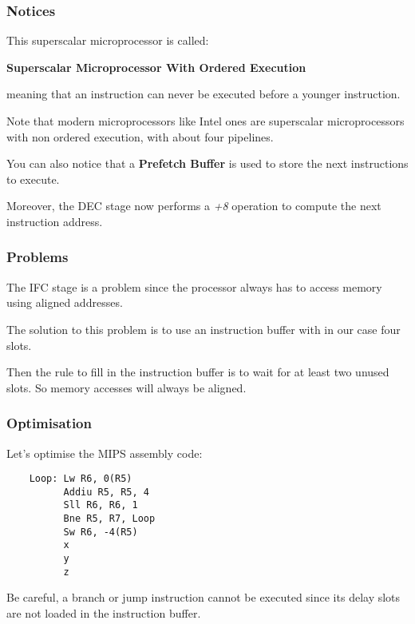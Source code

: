 \begin{frame}
  \frametitle{Notices}

  This superscalar microprocessor is called:

  \nl

  \textbf{Superscalar Microprocessor With Ordered Execution}

  \nl

  meaning that an instruction can never be executed before a
  younger instruction.

  \nl

  Note that modern microprocessors like Intel ones are superscalar
  microprocessors with non ordered execution, with about four pipelines.

  \nl

  You can also notice that a \textbf{Prefetch Buffer} is used to store
  the next instructions to execute.

  \nl

  Moreover, the DEC stage now performs a \textit{+8} operation to compute
  the next instruction address.
\end{frame}


\begin{frame}
  \frametitle{Problems}

  The IFC stage is a problem since the processor always has to access
  memory using aligned addresses.

  \nl

  The solution to this problem is to use an instruction buffer with in our
  case four slots.

  \nl

  Then the rule to fill in the instruction buffer is to wait for at least
  two unused slots. So memory accesses will always be aligned.
\end{frame}


\begin{frame}[containsverbatim]
  \frametitle{Optimisation}

  Let's optimise the MIPS assembly code:

  \begin{verbatim}
    Loop: Lw R6, 0(R5)
          Addiu R5, R5, 4
          Sll R6, R6, 1
          Bne R5, R7, Loop
          Sw R6, -4(R5)
          x
          y
          z
  \end{verbatim}

  Be careful, a branch or jump instruction cannot be executed since its delay
  slots are not loaded in the instruction buffer.
\end{frame}

